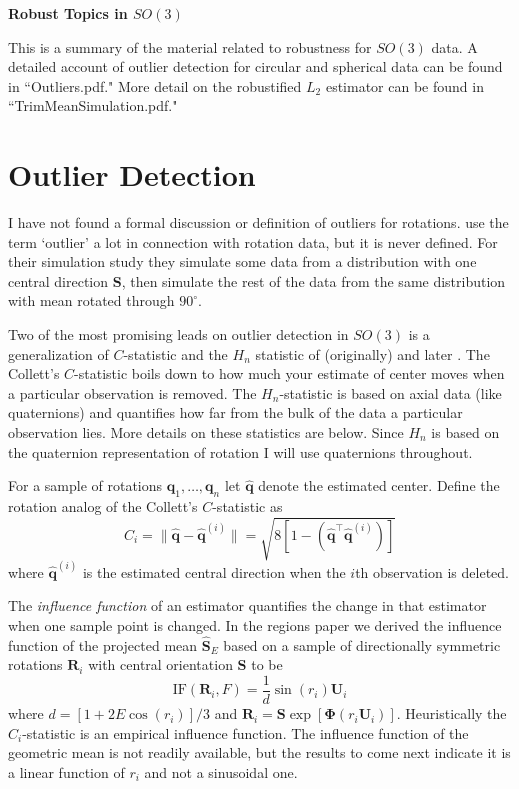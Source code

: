 \documentclass{article}\usepackage[]{graphicx}\usepackage[]{color}
\newcommand{\ProjMean}{{\widehat{\bm S}_{E}}}
\newcommand{\qest}{{\hat{\bm q}}}
\begin{document}
\begin{center}
\Large{\bf Robust Topics in $SO(3)$}
\end{center}
\normalsize
This is a summary of the material related to robustness for $SO(3)$ data.  A detailed account of outlier detection for circular and spherical data can be found in ``Outliers.pdf."  More detail on the robustified $L_2$ estimator can be found in ``TrimMeanSimulation.pdf."



 
\section{Outlier Detection}\label{sec:outliers}
 
I have not found a formal discussion or definition of outliers for rotations. \cite{fletcher2008} use the term `outlier' a lot in connection with rotation data, but it is never defined.  For their simulation study they simulate some data from a distribution with one central direction $\bm S$, then simulate the rest of the data from the same distribution with mean rotated through $90^\circ$.

Two of the most promising leads on outlier detection in $SO(3)$ is a generalization of \cite{collett1980} $C$-statistic and the $H_n$ statistic of (originally) \cite{best1986} and later \cite{figueiredo2005}.  The Collett's $C$-statistic boils down to how much your estimate of center moves when a particular observation is removed.  The $H_n$-statistic is based on axial data (like quaternions) and quantifies how far from the bulk of the data a particular observation lies.  More details on these statistics are below.  Since $H_n$ is based on the quaternion representation of rotation I will use quaternions throughout. 

For a sample of rotations $\bm q_1,\dots,\bm q_n$ let $\qest$ denote the estimated center.  Define the rotation analog of the Collett's $C$-statistic as 
\begin{equation}\label{eqn:Ci}
C_i=\|\qest-\hat{\bm q}^{(i)}\|=\sqrt{8[1-(\qest^\top\qest^{(i)})]}
\end{equation}
where $\qest^{(i)}$ is the estimated central direction when the $i$th observation is deleted.  

The \emph{influence function} of an estimator quantifies the change in that estimator when one sample point is changed.  In the regions paper we derived the influence function of the projected mean $\ProjMean$ based on a sample of directionally symmetric rotations $\bm R_i$ with central orientation $\bm S$ to be
\begin{equation}\label{eqn:IF}
\text{IF}(\bm R_i,F)=\frac{1}{d}\sin(r_i)\bm U_i
\end{equation}
where $d=[1+2E\cos(r_i)]/3$ and $\bm R_i=\bm S\exp[\bm\Phi(r_i\bm U_i)]$.  Heuristically the $C_i$-statistic is an empirical influence function.  The influence function of the geometric mean is not readily available, but the results to come next indicate it is a linear function of $r_i$ and not a sinusoidal one.
\end{document}
